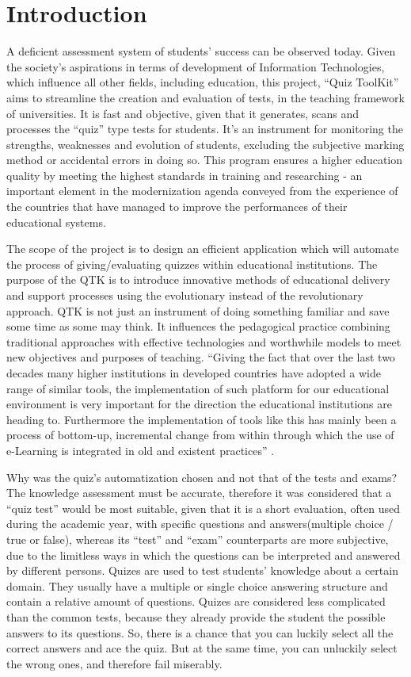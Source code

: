 \section*{Introduction}


A deficient assessment system of students’ success can be observed today. Given the society’s  aspirations in terms of development of Information Technologies, which influence all other fields, including education, this project, “Quiz ToolKit” aims to streamline the creation and evaluation of tests, in the teaching framework of universities. It is fast and objective, given that it generates, scans and processes the “quiz” type tests for students. It’s an instrument for monitoring the strengths, weaknesses and evolution of students, excluding the subjective marking method or accidental errors in doing so. This program ensures a higher education quality by meeting the highest standards in training and researching - an important element in the modernization agenda conveyed from the experience of the countries that have managed to improve the performances of their educational systems.

The scope of the project is to design an efficient application which will automate the process of giving/evaluating quizzes within educational institutions. The purpose of the QTK is to introduce innovative methods of educational delivery and support processes using the evolutionary instead of the revolutionary approach. QTK is not just an instrument of doing something familiar and save some time as some may think. It influences the pedagogical practice combining traditional approaches with effective technologies and worthwhile models to meet new objectives and purposes of teaching. ``Giving the fact that over the last two decades many higher institutions in developed countries have adopted a wide range of similar tools, the implementation of such platform for our educational environment is very important for the direction the educational institutions are heading to. Furthermore the implementation of tools like this has mainly been a process of bottom-up, incremental change from within through which the use of e-Learning is integrated in old and existent practices'' \cite{introduction_collins}.

Why was the quiz’s automatization chosen and not that of the tests and exams? The knowledge assessment must be accurate, therefore it was considered that a “quiz test” would be most suitable, given that it is a short evaluation, often used during the academic year, with specific questions and answers(multiple choice / true or false), whereas its “test” and “exam” counterparts are more subjective, due to the limitless ways in which the questions can be interpreted and answered by different persons.
Quizes are used to test students’ knowledge about a certain domain. They usually have a multiple or single choice answering structure and contain a relative amount of questions. Quizes are considered less complicated than the common tests, because they already provide the student the possible answers to its questions. So, there is a chance that you can luckily select all the correct answers and ace the quiz. But at the same time, you can unluckily select the wrong ones, and therefore fail miserably.

